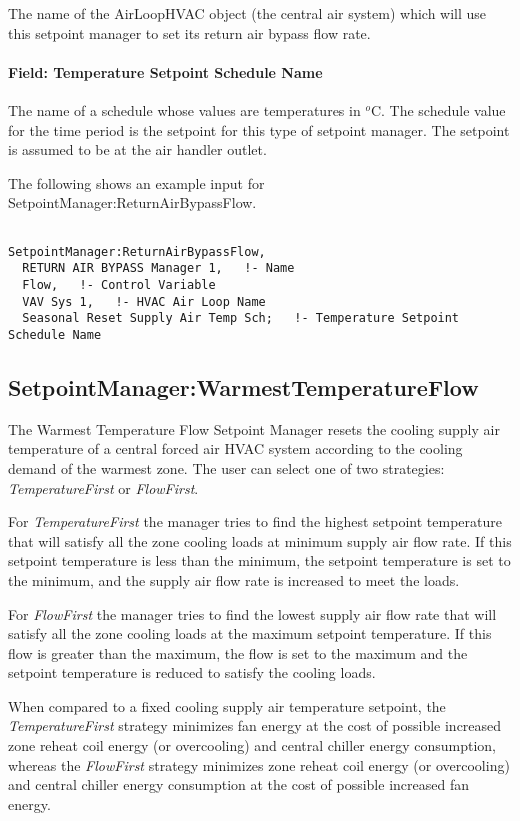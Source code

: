 The name of the AirLoopHVAC object (the central air system) which will use this setpoint manager to set its return air bypass flow rate.

\paragraph{Field: Temperature Setpoint Schedule Name}\label{field-temperature-setpoint-schedule-name}

The name of a schedule whose values are temperatures in \(^{o}\)C. The schedule value for the time period is the setpoint for this type of setpoint manager. The setpoint is assumed to be at the air handler outlet.

The following shows an example input for SetpointManager:ReturnAirBypassFlow.

\begin{lstlisting}

SetpointManager:ReturnAirBypassFlow,
  RETURN AIR BYPASS Manager 1,   !- Name
  Flow,   !- Control Variable
  VAV Sys 1,   !- HVAC Air Loop Name
  Seasonal Reset Supply Air Temp Sch;   !- Temperature Setpoint Schedule Name
\end{lstlisting}

\subsection{SetpointManager:WarmestTemperatureFlow}\label{setpointmanagerwarmesttemperatureflow}

The Warmest Temperature Flow Setpoint Manager resets the cooling supply air temperature of a central forced air HVAC system according to the cooling demand of the warmest zone. The user can select one of two strategies: \emph{TemperatureFirst} or \emph{FlowFirst}.

For \emph{TemperatureFirst} the manager tries to find the highest setpoint temperature that will satisfy all the zone cooling loads at minimum supply air flow rate. If this setpoint temperature is less than the minimum, the setpoint temperature is set to the minimum, and the supply air flow rate is increased to meet the loads.

For \emph{FlowFirst} the manager tries to find the lowest supply air flow rate that will satisfy all the zone cooling loads at the maximum setpoint temperature. If this flow is greater than the maximum, the flow is set to the maximum and the setpoint temperature is reduced to satisfy the cooling loads.

When compared to a fixed cooling supply air temperature setpoint, the \emph{TemperatureFirst} strategy minimizes fan energy at the cost of possible increased zone reheat coil energy (or overcooling) and central chiller energy consumption, whereas the \emph{FlowFirst} strategy minimizes zone reheat coil energy (or overcooling) and central chiller energy consumption at the cost of possible increased fan energy.

